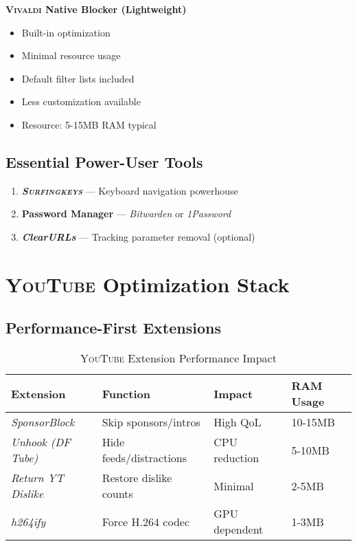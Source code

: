\documentclass[11pt,a4paper,oneside]{book}
\newcommand{\vivaldi}{\textsc{Vivaldi}}
\newcommand{\youtube}{\textsc{YouTube}}
\newcommand{\surfingkeys}{\textsc{Surfingkeys}}
\newcommand{\extension}[1]{\textit{\color{primaryblue}#1}}
\begin{document}
\textbf{\vivaldi{} Native Blocker (Lightweight)}
\begin{itemize}
    \item Built-in optimization
    \item Minimal resource usage
    \item Default filter lists included
    \item Less customization available
    \item Resource: 5-15MB RAM typical
\end{itemize}

\subsection{Essential Power-User Tools}

\begin{enumerate}
    \item \textbf{\extension{\surfingkeys{}}} — Keyboard navigation powerhouse
    \item \textbf{Password Manager} — \extension{Bitwarden} or \extension{1Password}
    \item \textbf{\extension{ClearURLs}} — Tracking parameter removal (optional)
\end{enumerate}

\section{\youtube{} Optimization Stack}

\subsection{Performance-First Extensions}

\begin{table}[h]
\centering
\begin{tabular}{@{}llll@{}}
\toprule
\textbf{Extension} & \textbf{Function} & \textbf{Impact} & \textbf{RAM Usage} \\
\midrule
\extension{SponsorBlock} & Skip sponsors/intros & High QoL & 10-15MB \\
\extension{Unhook (DF Tube)} & Hide feeds/distractions & CPU reduction & 5-10MB \\
\extension{Return YT Dislike} & Restore dislike counts & Minimal & 2-5MB \\
\extension{h264ify} & Force H.264 codec & GPU dependent & 1-3MB \\
\bottomrule
\end{tabular}
\caption{\youtube{} Extension Performance Impact}
\end{table}
\end{document}
